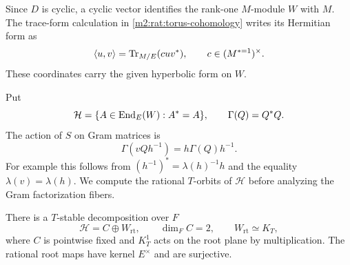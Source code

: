 Since $D$ is cyclic, a cyclic vector identifies the rank-one
$M$-module $W$ with $M$. The trace-form calculation in
\cref{m2:rat:torus-cohomology} writes its Hermitian form as
\begin{equation}\label{m2:leg:trace-hermitian}
 \langle u,v\rangle=\operatorname{Tr}_{M/E}(c uv^*),
 \qquad c\in(M^{*=1})^\times.
\end{equation}
These coordinates carry the given hyperbolic form on $W$.

Put
\[
 \mathcal H=\{A\in\operatorname{End}_E(W):A^*=A\},\qquad
 \Gamma(Q)=Q^*Q.
\]
The action of $S$ on Gram matrices is
\begin{equation}\label{m2:leg:gram-even}
 \Gamma(vQh^{-1})=h\Gamma(Q)h^{-1}.
\end{equation}
For example this follows from
$(h^{-1})^*=\lambda(h)^{-1}h$ and the equality
$\lambda(v)=\lambda(h)$. We compute the rational $T$-orbits of
$\mathcal H$ before analyzing the Gram factorization fibers.

\begin{lemma}\label{m2:leg:root-image}
There is a $T$-stable decomposition over $F$
\[
 \mathcal H=C\oplus W_{\mathrm{rt}},\qquad
 \dim_F C=2,\qquad W_{\mathrm{rt}}\simeq K_T,
\]
where $C$ is pointwise fixed and $K_T^1$ acts on the
root plane by multiplication. The rational root maps have kernel
$E^\times$ and are surjective.
\end{lemma}


